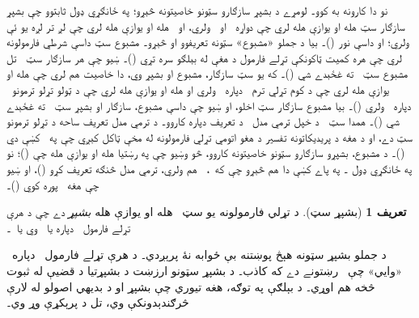 \documentclass[12pt,a4paper,oneside]{report}
\newcommand{\olfileid}[3]{\gdef\pspart{#1}\gdef\pschapter{#2}\gdef\pssection{#3}}
\gdef\pspart{#2}\gdef\pschapter{#3}\gdef\pssection{}%
\newcommand{\ollabel}[1]{\label{\pspart:\pschapter:\pssection:#1}}
\theoremstyle{definition}
\newtheorem{defn}[thm]{تعريف}
\newenvironment{explain}{}{}
\begin{document}
\label{olpseg:OLP-0128-B015:start}
نو دا کارونه به کوو۔ لومړے د بشپړ سازګارو سټونو خاصيتونه
څېړو؛ په ځانګړي ډول ثابتوو چې بشپړ سازګار سټ
 هله او يوازې هله لري چې دواړه~ او~ ولري،
او~ هله او يوازې هله لري چې لږ تر لږه يو ئې ولري؛
او داسې نور ()۔ بيا د جملو
  «مشبوع» سټونه تعريفوو او څېړو۔ مشبوع سټ داسې شرطي فارمولونه لري
  چې هره کميت ټاکونکې تړلے فارمول د هغې له بېلګو سره تړي
  ()۔ ښيو چې هر سازګار سټ~\LR{$\Gamma$}
  تل مشبوع سټ~ ته غځېدے شي ()۔ که
  يو سټ سازګار، مشبوع او بشپړ وي، دا خاصيت هم لري چې
  \LR{$\lexists[x][!A(x)]$} هله او يوازې هله لري چې د کوم
    تړلي ترم~ دپاره~ ولري او
  \LR{$\lforall[x][!A(x)]$} هله او يوازې هله لري چې د
    ټولو تړلو ترمونو~ دپاره~ ولري
  ()۔
بيا مشبوع سازګار سټ
 اخلو، او ښيو چې داسې
مشبوع، سازګار او بشپړ
سټ~\LR{$\Gamma^*$} ته غځېدے شي ()۔ همدا
سټ~\LR{$\Gamma^*$} د خپل ترمي مدل~ د تعريف دپاره کاروو۔
د ترمي مدل تعريف ساحه د تړلو ترمونو سټ دے، او د هغه
  د پريديکاتونه تفسير د هغو اتومي
  تړلي فارمولونه له مخې ټاکل کېږي چې په~\LR{$\Gamma^*$} کښې دي
()۔ د مشبوع، بشپړو
سازګارو سټونو خاصيتونه کاروو، څو وښيو چې په رښتيا
 هله او
يوازې هله چې 
()؛ نو په ځانګړي ډول
۔
په پاے کښې دا هم څېړو چې که~\LR{$\Gamma$}،~\LR{$\eq$} هم ولري،
  ترمي مدل څنګه تعريف کړو ()،
  او ښيو چې هغه~\LR{$\Gamma^*$} پوره کوي ()۔
\label{olpseg:OLP-0128-B015:end}

\label{olpseg:OLP-0129-B005:start}
\olfileid{fol}{com}{ccs}
\label{olpseg:OLP-0129-B005:end}

\label{olpseg:OLP-0129-B006:start}
\label{olpseg:OLP-0129-B006:end}

\label{olpseg:OLP-0129-B007:start}
\begin{defn}[بشپړ سټ]
\ollabel{def:complete-set} د تړلي فارمولونه يو سټ~\LR{$\Gamma$} هله او
يوازې هله \emph{بشپړ} دے چې د هرې تړلے فارمول~
دپاره يا~ وي يا~۔
\end{defn}
\label{olpseg:OLP-0129-B007:end}

\label{olpseg:OLP-0129-B008:start}
\begin{explain}
د جملو بشپړ سټونه هېڅ پوښتنه بې ځوابه نۀ پرېږدي۔ د هرې
تړلے فارمول~ دپاره~\LR{$\Gamma$} «وايي» چې~ رښتونے دے که
کاذب۔ د بشپړ سټونو ارزښت د بشپړتيا د قضيې له ثبوت څخه هم
اوړي۔ د بېلګې په توګه، هغه تيوري چې بشپړ او د بديهي اصولو
له لارې څرګندېدونکې وي، تل د پرېکړې وړ وي۔
\end{explain}
\label{olpseg:OLP-0129-B008:end}
\end{document}
